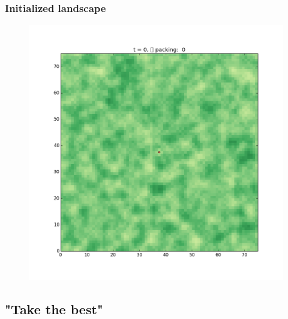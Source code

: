 \documentclass{beamer}
\begin{document}

\begin{frame}
\frametitle{Initialized landscape}

\begin{figure}
\includegraphics[width=\textwidth,height=0.8\textheight,keepaspectratio]{empty_landscape.png}
\end{figure}

\end{frame}

\subsection{"Take the best"}

\end{document}
